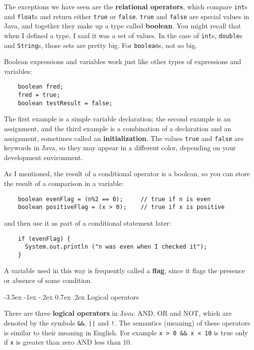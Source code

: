 \documentclass{book}
\makeatletter
\renewcommand{\section}{\@startsection 
    {section} {1} {0mm}%
    {-3.5ex \@plus -1ex \@minus -.2ex}%
    {0.7ex \@plus.2ex}%
    {\normalfont\Large\bfseries}}
\makeatother
\begin{document}
The exceptions we have seen are the {\bf relational operators}, which
compare {\tt int}s and {\tt float}s and return either {\tt true} or
{\tt false}.  {\tt true} and {\tt false} are special values in Java,
and together they make up a type called {\bf boolean}.  You might
recall that when I defined a type, I said it was a set of values.  In
the case of {\tt int}s, {\tt double}s and {\tt String}s, those sets
are pretty big.  For {\tt boolean}s, not so big.

Boolean expressions and variables work just like other types of
expressions and variables:

\begin{verbatim}
    boolean fred;
    fred = true;
    boolean testResult = false;
\end{verbatim}
%
The first example is a simple variable declaration;
the second example is an assignment, and the third example is a
combination of a declaration and an assignment, sometimes
called an {\bf initialization}.  The values {\tt true} and {\tt false}
are keywords in Java, so they may appear in a different color,
depending on your development environment.


As I mentioned, the result of a conditional operator is a boolean,
so you can store the result of a comparison in a variable:

\begin{verbatim}
    boolean evenFlag = (n%2 == 0);     // true if n is even
    boolean positiveFlag = (x > 0);    // true if x is positive
\end{verbatim}
%
and then use it as part of a conditional statement later:

\begin{verbatim}
    if (evenFlag) {
      System.out.println ("n was even when I checked it");
    }
\end{verbatim}
%
A variable used in this way is frequently called a {\bf flag},
since it flags the presence or absence of some condition.

\section{Logical operators}

There are three {\bf logical operators} in Java: AND, OR and NOT,
which are denoted by the symbols {\tt \&\&}, {\tt ||} and
{\tt !}.  The semantics (meaning) of these operators is similar
to their meaning in English.  For example {\tt x > 0 \&\& x < 10}
is true only if {\tt x} is greater than zero AND less than 10.
\end{document}
